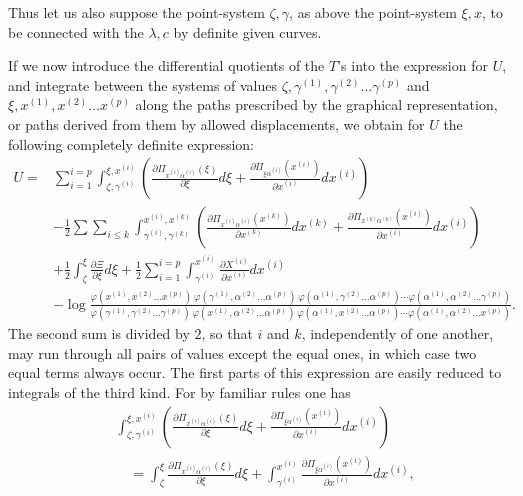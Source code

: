 \documentclass[10pt]{article}
\begin{document}
Thus let us also suppose the point-system \(\zeta,\gamma\), as above the point-system \(\xi,x\), to be connected with the \(\lambda,c\) by definite given curves.

If we now introduce the differential quotients of the \(T\)'s into the expression for \(U\), and integrate between the systems of values \(\zeta,\gamma^{(1)},\gamma^{(2)}\ldots\gamma^{(p)}\) and \(\xi,x^{(1)},x^{(2)}\ldots x^{(p)}\) along the paths prescribed by the graphical representation, or paths derived from them by allowed displacements, we obtain for \(U\) the following completely definite expression:
\begingroup\scriptsize
\[
\begin{aligned}
U={}&\sum_{i=1}^{i=p}\int_{\zeta,\gamma^{(i)}}^{\xi,x^{(i)}}
\left(\frac{\partial\Pi_{x^{(i)}\alpha^{(i)}}(\xi)}{\partial\xi}d\xi
+\frac{\partial\Pi_{\xi\alpha^{(i)}}(x^{(i)})}{\partial x^{(i)}}dx^{(i)}\right)\\
&-\frac12\sum\sum_{i\le k}\int_{\gamma^{(i)},\gamma^{(k)}}^{x^{(i)},x^{(k)}}
\left(\frac{\partial\Pi_{x^{(i)}\alpha^{(i)}}(x^{(k)})}{\partial x^{(k)}}dx^{(k)}
+\frac{\partial\Pi_{x^{(k)}\alpha^{(k)}}(x^{(i)})}{\partial x^{(i)}}dx^{(i)}\right)\\
&+\frac12\int_{\zeta}^{\xi}\frac{\partial\Xi}{\partial\xi}d\xi
+\frac12\sum_{i=1}^{i=p}\int_{\gamma^{(i)}}^{x^{(i)}}\frac{\partial X^{(i)}}{\partial x^{(i)}}dx^{(i)}\\
&-\log\frac{\varphi(x^{(1)},x^{(2)}\ldots x^{(p)})\,\varphi(\gamma^{(1)},\alpha^{(2)}\ldots\alpha^{(p)})\,\varphi(\alpha^{(1)},\gamma^{(2)}\ldots\alpha^{(p)})\cdots\varphi(\alpha^{(1)},\alpha^{(2)}\ldots\gamma^{(p)})}
{\varphi(\gamma^{(1)},\gamma^{(2)}\ldots\gamma^{(p)})\,\varphi(x^{(1)},\alpha^{(2)}\ldots\alpha^{(p)})\,\varphi(\alpha^{(1)},x^{(2)}\ldots\alpha^{(p)})\cdots\varphi(\alpha^{(1)},\alpha^{(2)}\ldots x^{(p)})}.
\end{aligned}
\]
\endgroup
The second sum is divided by \(2\), so that \(i\) and \(k\), independently of one another, may run through all pairs of values except the equal ones, in which case two equal terms always occur. The first parts of this expression are easily reduced to integrals of the third kind. For by familiar rules one has
\begingroup\footnotesize
\[
\begin{aligned}
&\int_{\zeta,\gamma^{(i)}}^{\xi,x^{(i)}}
\left(\frac{\partial\Pi_{x^{(i)}\alpha^{(i)}}(\xi)}{\partial\xi}d\xi
+\frac{\partial\Pi_{\xi\alpha^{(i)}}(x^{(i)})}{\partial x^{(i)}}dx^{(i)}\right)\\
&\quad=\int_{\zeta}^{\xi}\frac{\partial\Pi_{x^{(i)}\alpha^{(i)}}(\xi)}{\partial\xi}d\xi
+\int_{\gamma^{(i)}}^{x^{(i)}}\frac{\partial\Pi_{\xi\alpha^{(i)}}(x^{(i)})}{\partial x^{(i)}}dx^{(i)},
\end{aligned}
\]
\end{document}
